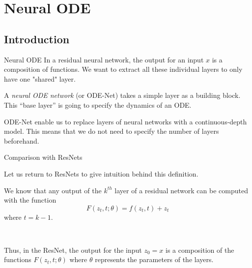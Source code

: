 \documentclass[11pt]{beamer}
\begin{document}
\section{Neural ODE} \label{neuralode}
\subsection{Introduction}

\begin{frame}{Neural ODE}
In a residual neural network, the output for an input $x$ is a composition of functions. We want to extract all these individual layers to only have one "shared" layer.

\begin{definition}
A \textit{neural ODE network} (or ODE-Net) \cite{1,2,3,6} takes a simple layer as a building block. This “base layer” is going to specify the dynamics of an ODE.

\end{definition}
ODE-Net enable us to replace layers of neural networks with a continuous-depth model. This means that we do not need to specify the number of layers beforehand.
\end{frame}
\begin{frame}{Comparison with ResNets}

Let us return to ResNets to give intuition behind this definition. 

We know that any output of the $k^{th}$ layer of a residual network can be computed with the function
\begin{equation*}
F(z_t, t; \theta) = f(z_t, t) + z_t
\end{equation*}
where $t = k - 1$.

~

Thus, in the ResNet, the output for the input $z_0 = x$ is a composition of the functions $F(z_t, t; \theta)$ where $\theta$ represents the parameters of the layers.
\end{frame}
\end{document}
